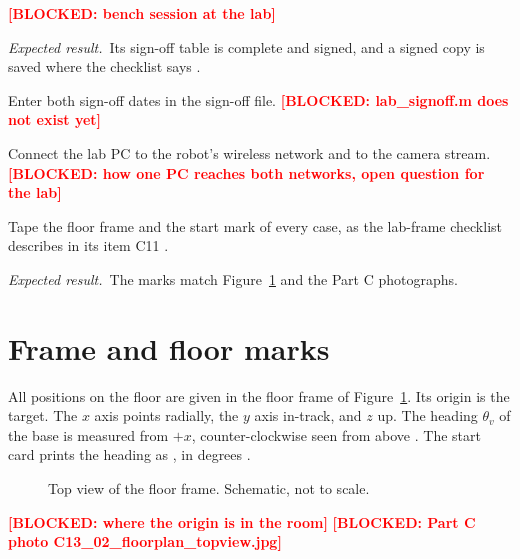 \documentclass[11pt]{article}
\newcommand{\todo}[1]{\textcolor{red}{\textbf{[#1]}}}
\newcommand{\out}[1]{\texttt{\romecode{#1}}}
\newif\ifshowsrc
\newcommand{\src}[1]{\ifshowsrc{\scriptsize\,[\texttt{\romecode{#1}}]}\fi}
\newcommand{\expect}{\par\textit{Expected result.}\ }
\begin{document}
\begin{steps}
  \todo{BLOCKED: bench session at the lab}
  \expect Its sign-off table is complete and signed, and a signed copy is saved where the checklist
  says \src{docs/lab/PART_F_BENCH_CHECKLIST.md:5}.
  \item Enter both sign-off dates in the sign-off file.
  \todo{BLOCKED: lab\_signoff.m does not exist yet}
  \item Connect the lab PC to the robot's wireless network and to the camera stream.
  \todo{BLOCKED: how one PC reaches both networks, open question for the lab}
  \item Tape the floor frame and the start mark of every case, as the lab-frame checklist
  describes in its item C11 \src{docs/lab/PART_C_LAB_VISIT.md:179-194}.
  \expect The marks match Figure~\ref{fig:frame} and the Part C photographs.
\end{steps}

\section{Frame and floor marks}\label{sec:frame}
All positions on the floor are given in the floor frame of Figure~\ref{fig:frame}. Its origin is
the target. The $x$ axis points radially, the $y$ axis in-track, and $z$ up. The heading
$\theta_v$ of the base is measured from $+x$, counter-clockwise seen from above
\src{define_constants.m:34-36}. The start card prints the heading as
\out{yaw}, in degrees \src{define_constants.m:426-427}.

\begin{figure}[h]
  \centering
  
  \caption{Top view of the floor frame. Schematic, not to scale.}
  \label{fig:frame}
\end{figure}

\todo{BLOCKED: where the origin is in the room}
\todo{BLOCKED: Part C photo C13\_02\_floorplan\_topview.jpg}
\end{document}

